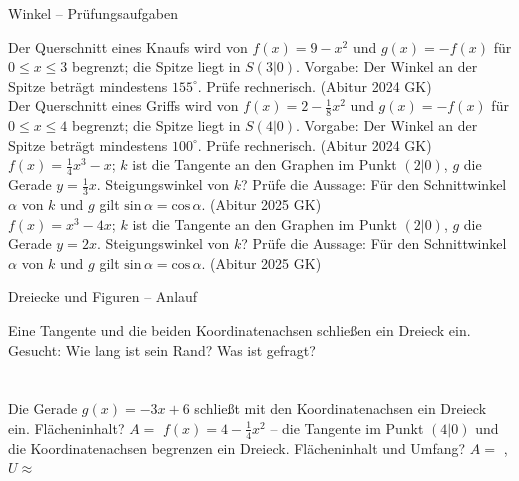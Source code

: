 \begin{aufgabe}{Winkel – Prüfungsaufgaben}
\begin{teile}
\teil Der Querschnitt eines Knaufs wird von $f(x) = 9 - x^2$ und $g(x) = -f(x)$ für $0 \le x \le 3$ begrenzt; die Spitze liegt in $S(3 | 0)$. Vorgabe: Der Winkel an der Spitze beträgt mindestens $155^\circ$. Prüfe rechnerisch. \hfill (Abitur 2024 GK) \\ \leerfeld
\teil Der Querschnitt eines Griffs wird von $f(x) = 2 - \frac{1}{8}x^2$ und $g(x) = -f(x)$ für $0 \le x \le 4$ begrenzt; die Spitze liegt in $S(4 | 0)$. Vorgabe: Der Winkel an der Spitze beträgt mindestens $100^\circ$. Prüfe rechnerisch. \hfill (Abitur 2024 GK) \\ \leerfeld
\teil $f(x) = \frac{1}{4}x^3 - x$; $k$ ist die Tangente an den Graphen im Punkt $(2 | 0)$, $g$ die Gerade $y = \frac{1}{3}x$. Steigungswinkel von $k$? Prüfe die Aussage: Für den Schnittwinkel $\alpha$ von $k$ und $g$ gilt $\mathrm{sin}\,\alpha = \mathrm{cos}\,\alpha$. \hfill (Abitur 2025 GK) \\ \leerfeld
\teil $f(x) = x^3 - 4x$; $k$ ist die Tangente an den Graphen im Punkt $(2 | 0)$, $g$ die Gerade $y = 2x$. Steigungswinkel von $k$? Prüfe die Aussage: Für den Schnittwinkel $\alpha$ von $k$ und $g$ gilt $\mathrm{sin}\,\alpha = \mathrm{cos}\,\alpha$. \hfill (Abitur 2025 GK) \\ \leerfeld
\end{teile}
\end{aufgabe}

\begin{aufgabe}{Dreiecke und Figuren – Anlauf}
\begin{teile}
\teil Eine Tangente und die beiden Koordinatenachsen schließen ein Dreieck ein. Gesucht: Wie lang ist sein Rand? Was ist gefragt? \\  \\  \\ 
\teil Die Gerade $g(x) = -3x + 6$ schließt mit den Koordinatenachsen ein Dreieck ein. Flächeninhalt? $A =$ \leerfeld
\teil $f(x) = 4 - \frac{1}{4}x^2$ – die Tangente im Punkt $(4 | 0)$ und die Koordinatenachsen begrenzen ein Dreieck. Flächeninhalt und Umfang? $A =$ \leerfeld , $U \approx$ \leerfeld
\end{teile}
\end{aufgabe}

